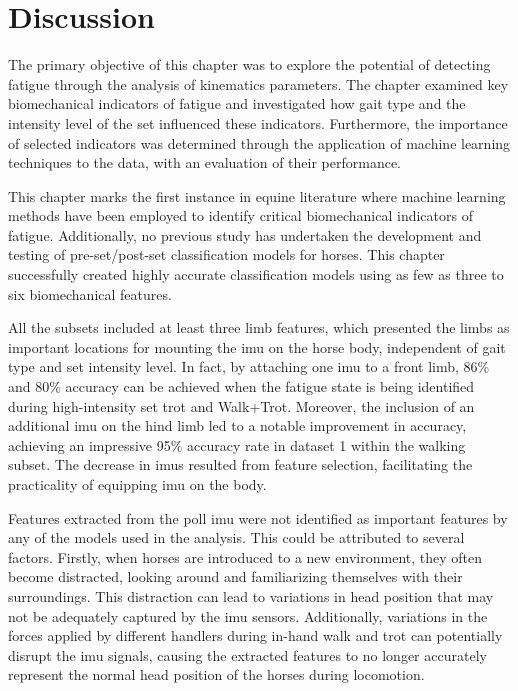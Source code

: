\section{Discussion}
\label{sec:discussion}

The primary objective of this chapter was to explore the potential of detecting fatigue through the analysis of kinematics parameters. The chapter examined key biomechanical indicators of fatigue and investigated how gait type and the intensity level of the \gls{set} influenced these indicators. Furthermore, the importance of selected indicators was determined through the application of machine learning techniques to the data, with an evaluation of their performance. 

This chapter marks the first instance in equine literature where machine learning methods have been employed to identify critical biomechanical indicators of fatigue. Additionally, no previous study has undertaken the development and testing of pre-\gls{set}/post-\gls{set} classification models for horses. This chapter successfully created highly accurate classification models using as few as three to six biomechanical features.

All the subsets included at least three limb features, which presented the limbs as important locations for mounting the \gls{imu} on the horse body, independent of gait type and \gls{set} intensity level. In fact, by attaching one \gls{imu} to a front limb, 86\% and 80\% accuracy can be achieved when the fatigue state is being identified during high-intensity \gls{set} trot and Walk+Trot. Moreover,  the inclusion of an additional \gls{imu} on the hind limb led to a notable improvement in accuracy, achieving an impressive 95\% accuracy rate in dataset 1 within the walking subset. The decrease in \gls{imu}s resulted from feature selection, facilitating the practicality of equipping \gls{imu} on the body. 

Features extracted from the poll \gls{imu} were not identified as important features by any of the models used in the analysis. This could be attributed to several factors. Firstly, when horses are introduced to a new environment, they often become distracted, looking around and familiarizing themselves with their surroundings. This distraction can lead to variations in head position that may not be adequately captured by the \gls{imu} sensors. Additionally, variations in the forces applied by different handlers during in-hand walk and trot can potentially disrupt the \gls{imu} signals, causing the extracted features to no longer accurately represent the normal head position of the horses during locomotion. 

